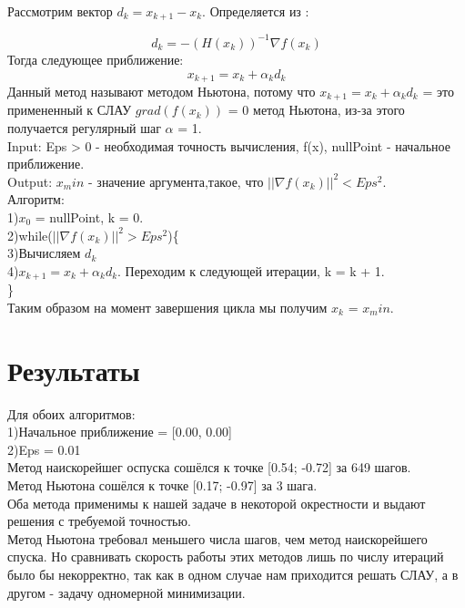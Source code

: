 \documentclass[a4]{article}
\begin{document}
				Рассмотрим вектор $d_k = x_{k+1} - x_k$. Определяется из :
				
				$$d_k = -(H(x_k))^{-1} \nabla f(x_k)$$
				Тогда следующее приближение:
				$$x_{k + 1} = x_k + \alpha_k d_k$$
				Данный метод называют методом Ньютона, потому что $x_{k + 1} = x_k + \alpha_k d_k$ = это примененный к СЛАУ $grad(f(x_k))$ = 0 метод Ньютона, из-за этого получается регулярный шаг $\alpha$ = 1.\\
				
				Input: Eps > 0 - необходимая точность вычисления, f(x), nullPoint - начальное приближение.\\
				
				Output: $x_min$ - значение аргумента,такое, что $||\nabla f(x_k)||^2 < Eps^2$.\\
				
				Алгоритм:\\
					1)$x_0$ = nullPoint, k = 0.\\
					2)while($||\nabla f(x_k)||^2 > Eps^2$)\{\\
						
						3)Вычисляем $d_k$\\
						
						4)$x_{k + 1} = x_k + \alpha_k d_k$. Переходим к следующей итерации, k = k + 1.\\
						\}\\
			
			Таким образом на момент завершения цикла мы получим $x_k$ = $x_min$.\\
			
			\section{Результаты}
				Для обоих алгоритмов:\\
				1)Начальное приближение = [0.00, 0.00]\\
				2)Eps = 0.01\\
				Метод наискорейшег оспуска сошёлся к точке [0.54; -0.72] за 649 шагов.\\
				Метод Ньютона сошёлся к точке [0.17; -0.97] за 3 шага.\\
				
				Оба метода применимы к нашей задаче в некоторой окрестности и выдают решения с требуемой точностью.\\
				Метод Ньютона требовал меньшего числа шагов, чем метод наискорейшего спуска. Но сравнивать скорость работы этих методов лишь по числу итераций было бы некорректно, так как в одном случае нам приходится решать СЛАУ, а в другом - задачу одномерной минимизации.
			
\end{document}
